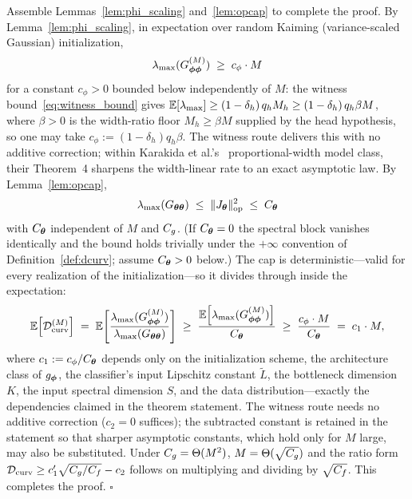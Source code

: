 Assemble Lemmas~\ref{lem:phi_scaling} and~\ref{lem:opcap} to complete
the proof. By Lemma~\ref{lem:phi_scaling}, in expectation over random
Kaiming (variance-scaled Gaussian) initialization,
\[
    \lambda_{\max}(G^{(M)}_{{\boldsymbol{\phi}}{\boldsymbol{\phi}}})
    \;\geq\; c_\phi \cdot M
\]
for a constant $c_\phi > 0$ bounded below independently of $M$: the
witness bound~\eqref{eq:witness_bound} gives
$\mathbb{E}[\lambda_{\max}] \geq (1 - \delta_h)\, q_h M_h \geq
(1 - \delta_h)\, q_h \beta M$, where $\beta > 0$ is the width-ratio
floor $M_h \geq \beta M$ supplied by the head hypothesis, so one may
take $c_\phi := (1 - \delta_h) q_h \beta$. The witness route
delivers this with no additive correction; within
Karakida et al.'s~\cite{karakida2019universal} proportional-width
model class, their Theorem~4 sharpens the width-linear rate to an
exact asymptotic law. By
Lemma~\ref{lem:opcap},
\[
    \lambda_{\max}(G_{{\boldsymbol{\theta}}{\boldsymbol{\theta}}})
    \;\leq\; \|J_{\boldsymbol{\theta}}\|_{\mathrm{op}}^2 \;\leq\; C_{\boldsymbol{\theta}}
\]
with $C_{\boldsymbol{\theta}}$ independent of $M$ and $C_g$. (If $C_{\boldsymbol{\theta}} = 0$
the spectral block vanishes identically and the bound holds
trivially under the $+\infty$ convention of
Definition~\ref{def:dcurv}; assume $C_{\boldsymbol{\theta}} > 0$ below.) The cap
is deterministic---valid for every realization of the
initialization---so it divides through inside the expectation:
\begin{equation}
    \mathbb{E}\!\left[\mathcal{D}_{\mathrm{curv}}^{(M)}\right]
    \;=\; \mathbb{E}\!\left[\frac{\lambda_{\max}(G^{(M)}_{{\boldsymbol{\phi}}{\boldsymbol{\phi}}})}
                {\lambda_{\max}(G_{{\boldsymbol{\theta}}{\boldsymbol{\theta}}})}\right]
    \;\geq\; \frac{\mathbb{E}\!\left[\lambda_{\max}(G^{(M)}_{{\boldsymbol{\phi}}{\boldsymbol{\phi}}})\right]}
                  {C_{\boldsymbol{\theta}}}
    \;\geq\; \frac{c_\phi \cdot M}{C_{\boldsymbol{\theta}}}
    \;=\; c_1 \cdot M,
    \label{eq:disparity_bound}
\end{equation}
where $c_1 := c_\phi / C_{\boldsymbol{\theta}}$ depends only on the initialization
scheme, the architecture class of $g_{\boldsymbol{\phi}}$, the classifier's input
Lipschitz constant $\widetilde{L}$, the bottleneck dimension $K$,
the input spectral dimension $S$, and the data
distribution---exactly the dependencies claimed in the theorem
statement. The witness route needs no additive correction ($c_2 =
0$ suffices); the subtracted constant is retained in the statement
so that sharper asymptotic constants, which hold only for $M$ large,
may also be substituted. Under
$C_g = \Theta(M^2)$, $M = \Theta(\sqrt{C_g})$ and the ratio form
$\mathcal{D}_{\mathrm{curv}} \geq c_1' \sqrt{C_g / C_f} - c_2$
follows on multiplying and dividing by $\sqrt{C_f}$. This completes
the proof.
\hfill$\square$

